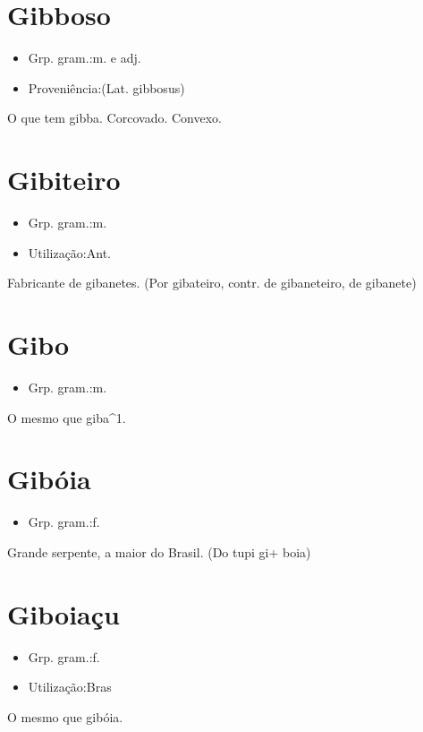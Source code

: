 \section{Gibboso}
\begin{itemize}
\item {Grp. gram.:m.  e  adj.}
\end{itemize}
\begin{itemize}
\item {Proveniência:(Lat. \textunderscore gibbosus\textunderscore )}
\end{itemize}
O que tem gibba.
Corcovado.
Convexo.
\section{Gibiteiro}
\begin{itemize}
\item {Grp. gram.:m.}
\end{itemize}
\begin{itemize}
\item {Utilização:Ant.}
\end{itemize}
Fabricante de gibanetes.
(Por \textunderscore gibateiro\textunderscore , contr. de \textunderscore gibaneteiro\textunderscore , de \textunderscore gibanete\textunderscore )
\section{Gibo}
\begin{itemize}
\item {Grp. gram.:m.}
\end{itemize}
O mesmo que \textunderscore giba\textunderscore ^1.
\section{Gibóia}
\begin{itemize}
\item {Grp. gram.:f.}
\end{itemize}
Grande serpente, a maior do Brasil.
(Do tupi \textunderscore gi\textunderscore  + \textunderscore boia\textunderscore )
\section{Giboiaçu}
\begin{itemize}
\item {Grp. gram.:f.}
\end{itemize}
\begin{itemize}
\item {Utilização:Bras}
\end{itemize}
O mesmo que \textunderscore gibóia\textunderscore .
